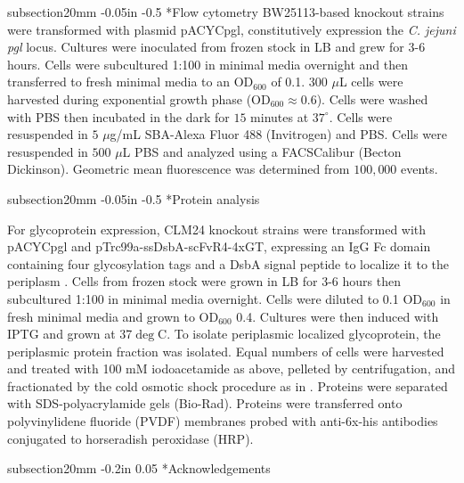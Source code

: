 \documentclass[12pt]{article}
\makeatletter
\renewcommand\subsection{\@startsection
	{subsection}{2}{0mm}
	{-0.05in}
	{-0.5\baselineskip}
	{\normalfont\normalsize\bfseries}}
\renewcommand\section{\@startsection
	{subsection}{2}{0mm}
	{-0.2in}
	{0.05\baselineskip}
	{\normalfont\large\bfseries}}
\makeatother
\begin{document}
\subsection*{Flow cytometry}
BW25113-based knockout strains were transformed with plasmid pACYCpgl, constitutively expression the \textit{C. jejuni} \textit{pgl} locus. 
Cultures were inoculated from frozen stock in LB and grew for 3-6 hours. 
Cells were subcultured 1:100 in minimal media overnight and then transferred to fresh minimal media to an OD$_{600}$ of 0.1. 
$300$ $\mu$L cells were harvested during exponential growth phase (OD$_{600}\approx 0.6$). 
Cells were washed with PBS then incubated in the dark for $15$ minutes at  $37^{\circ}$. 
Cells were resuspended in $5$ $\mu$g/mL SBA-Alexa Fluor 488 (Invitrogen) and PBS. 
Cells were resuspended in $500$ $\mu$L PBS and analyzed using a FACSCalibur (Becton Dickinson). 
Geometric mean fluorescence was determined from $100,000$ events. 

\subsection*{Protein analysis}

For glycoprotein expression, CLM24 knockout strains were transformed with pACYCpgl and pTrc99a-ssDsbA-scFvR4-4xGT, expressing an IgG Fc domain containing four glycosylation tags and a DsbA signal peptide to localize it to the periplasm \cite{2011-fisher-haitjema-delisa-AppEnvMicrobio}. 
Cells from frozen stock were grown in LB for 3-6 hours then subcultured 1:100 in minimal media overnight. 
Cells were diluted to 0.1 OD$_{600}$ in fresh minimal media and grown to OD$_{600}$ 0.4. 
Cultures were then induced with IPTG and grown at 37$\deg$C. 
To isolate periplasmic localized glycoprotein, the periplasmic protein fraction was isolated. 
Equal numbers of cells were harvested and treated with 100 mM iodoacetamide as above, pelleted by centrifugation, and fractionated by the cold osmotic shock procedure as in \cite{2003-delisa-georgiou-PNAS}. 
Proteins were separated with SDS-polyacrylamide gels (Bio-Rad). 
Proteins were transferred onto polyvinylidene fluoride (PVDF) membranes probed with anti-6x-his antibodies conjugated to horseradish peroxidase (HRP). 

\newpage
\section*{Acknowledgements}
\end{document}
